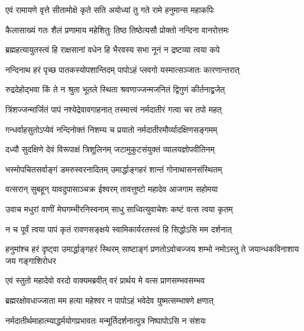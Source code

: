 \twolineshloka
{एवं रामायणे वृत्ते सीतामोक्षे कृते सति}
{अयोध्यां तु गते रामे हनुमान्स महाकपिः}%

\twolineshloka
{कैलासाख्यं गतः शैलं प्रणामाय महेशितुः}
{तिष्ठ तिष्ठेत्यसौ प्रोक्तो नन्दिना वानरोत्तमः}%

\twolineshloka
{ब्रह्महत्यायुतस्त्वं हि राक्षसानां वधेन हि}
{भैरवस्य सभा नूनं न द्रष्टव्या त्वया कपे}%


\twolineshloka
{नन्दिनाथ हरं पृच्छ पातकस्योपशान्तिदम्}
{पापोऽहं प्लवगो यस्मात्सञ्जातः कारणान्तरात्}%


\twolineshloka
{रुद्रदेहोद्भवा किं ते न श्रुता भूतले स्थिता}
{श्रवणाज्जन्मजनितं द्विगुणं कीर्तनाद्व्रजेत्}%

\twolineshloka
{त्रिंशज्जन्मार्जितं पापं नश्येद्रेवावगाहनात्}
{तस्मात्त्वं नर्मदातीरं गत्वा चर तपो महत्}%

\twolineshloka
{गन्धर्वाहसुतोऽप्येवं नन्दिनोक्तं निशम्य च}
{प्रयातो नर्मदातीरमौर्व्यादक्षिणसङ्गमम्}%

\twolineshloka
{दध्यौ सुदक्षिणे देवं विरूपाक्षं त्रिशूलिनम्}
{जटामुकुटसंयुक्तं व्यालयज्ञोपवीतिनम्}%

\twolineshloka
{भस्मोपचितसर्वाङ्गं डमरुस्वरनादितम्}
{उमार्द्धाङ्गहरं शान्तं गोनाथासनसंस्थितम्}%

\twolineshloka
{वत्सरान् सुबहून् यावदुपासाञ्चक्र ईश्वरम्}
{तावत्तुष्टो महादेव आजगाम सहोमया}%

\twolineshloka
{उवाच मधुरां वाणीं मेघगम्भीरनिस्वनाम्}
{साधु साध्वित्युवाचेशः कष्टं वत्स त्वया कृतम्}%

\twolineshloka
{न च पूर्वं त्वया पापं कृतं रावणसङ्क्षये}
{स्वामिकार्यरतस्त्वं हि सिद्धोऽसि मम दर्शनात्}%

\threelineshloka
{हनुमांश्च हरं दृष्ट्वा उमार्द्धाङ्गहरं स्थिरम्}
{साष्टाङ्गं प्रणतोऽवोचज्जय शम्भो नमोऽस्तु ते}
{जयान्धकविनाशाय जय गङ्गाशिरोधर}%

\twolineshloka
{एवं स्तुतो महादेवो वरदो वाक्यमब्रवीत्}
{वरं प्रार्थय मे वत्स प्राणसम्भवसम्भव}%


\twolineshloka
{ब्रह्मरक्षोवधाज्जाता मम हत्या महेश्वर}
{न पापोऽहं भवेदेव युष्मत्सम्भाषणे क्षणात्}%


\twolineshloka
{नर्मदातीर्थमाहात्म्याद्धर्मयोगप्रभावतः}
{मन्मूर्तिदर्शनात्पुत्र निष्पापोऽसि न संशयः}%

